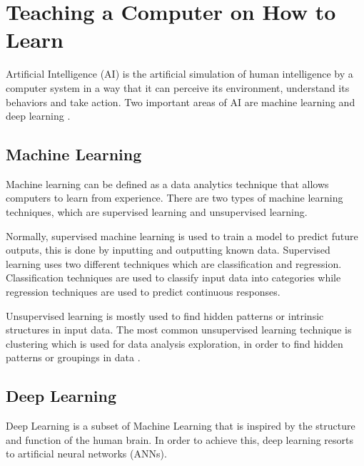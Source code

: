 

    \section{Teaching a Computer on How to Learn}
    \label{sec:teach}

    Artificial Intelligence (AI) is the artificial simulation of human intelligence by a computer system in a way that it can perceive its environment, understand its behaviors and take action. Two important areas of AI are machine learning and deep learning \cite{mathworks_AI}.

    

   \subsection{Machine Learning}

    \par Machine learning can be defined as a data analytics technique that allows computers to learn from experience. There are two types of machine learning techniques, which are supervised learning and unsupervised learning.
    \par Normally, supervised machine learning is used to train a model to predict future outputs, this is done by inputting and outputting known data. Supervised learning uses two different techniques which are classification and regression. Classification techniques are used to classify input data into categories while regression techniques are used to predict continuous responses. 
    \par Unsupervised learning is mostly used to find hidden patterns or intrinsic structures in input data. The most common unsupervised learning technique is clustering which is used for data analysis exploration, in order to find hidden patterns or groupings in data \cite{mathworks_ML}.

    \subsection{Deep Learning}

    \par Deep Learning is a subset of Machine Learning that is inspired by the structure and function of the human brain. In order to achieve this, deep learning resorts to artificial neural networks (ANNs).
    
